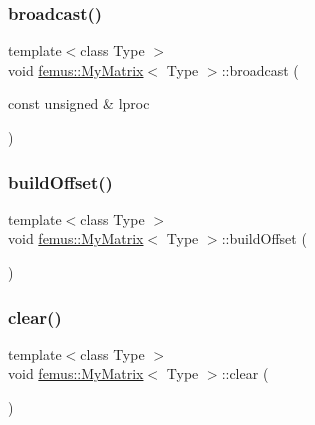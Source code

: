 \mbox{\label{classfemus_1_1_my_matrix_a09443391549adb392acb33399287cc4d}} 
\subsubsection{\texorpdfstring{broadcast()}{broadcast()}}
{\footnotesize\ttfamily template$<$class Type $>$ \\
void \mbox{\hyperlink{classfemus_1_1_my_matrix}{femus\+::\+My\+Matrix}}$<$ Type $>$\+::broadcast (\begin{DoxyParamCaption}\item[{const unsigned \&}]{lproc }\end{DoxyParamCaption})}

\mbox{\label{classfemus_1_1_my_matrix_ae65c1c929b4ab08648dde94bb8141bd3}} 
\subsubsection{\texorpdfstring{build\+Offset()}{buildOffset()}}
{\footnotesize\ttfamily template$<$class Type $>$ \\
void \mbox{\hyperlink{classfemus_1_1_my_matrix}{femus\+::\+My\+Matrix}}$<$ Type $>$\+::build\+Offset (\begin{DoxyParamCaption}{ }\end{DoxyParamCaption})}

\mbox{\label{classfemus_1_1_my_matrix_ab1808ad9a2032616e6c33361bc14d522}} 
\subsubsection{\texorpdfstring{clear()}{clear()}}
{\footnotesize\ttfamily template$<$class Type $>$ \\
void \mbox{\hyperlink{classfemus_1_1_my_matrix}{femus\+::\+My\+Matrix}}$<$ Type $>$\+::clear (\begin{DoxyParamCaption}{ }\end{DoxyParamCaption})}

